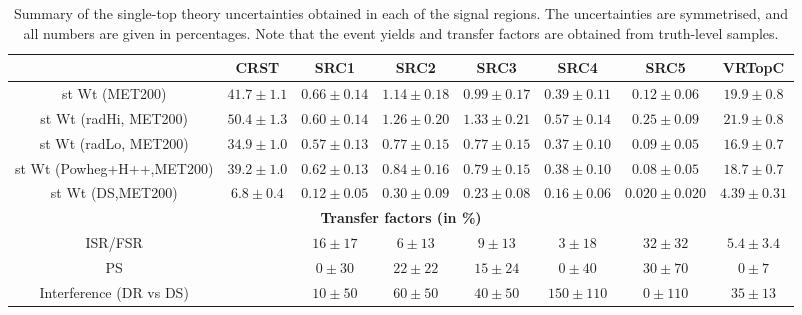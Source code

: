 \begin{description}
   \begin{table}[!h]
    \begin{center} \footnotesize
        \begin{tabular}{|c|c|c|c|c|c|c|c|}
        \hline
        & CRST  & SRC1 & SRC2 & SRC3 & SRC4 & SRC5 & VRTopC\\ \hline
          \hline
          st Wt (MET200)&          $41.7\pm 1.1$&          $0.66\pm 0.14$&         $1.14\pm 0.18$&         $0.99\pm 0.17$&         $0.39\pm 0.11$&         $0.12\pm 0.06$&         $19.9\pm 0.8$\\
          st Wt (radHi, MET200)&   $50.4\pm 1.3$&          $0.60\pm 0.14$&         $1.26\pm 0.20$&         $1.33\pm 0.21$&         $0.57\pm 0.14$&         $0.25\pm 0.09$&         $21.9\pm 0.8$\\
st Wt (radLo, MET200)&   $34.9\pm 1.0$&          $0.57\pm 0.13$&         $0.77\pm 0.15$&         $0.77\pm 0.15$&         $0.37\pm 0.10$&         $0.09\pm 0.05$&         $16.9\pm 0.7$\\
st Wt (Powheg+H++,MET200)&       $39.2\pm 1.0$&          $0.62\pm 0.13$&         $0.84\pm 0.16$&         $0.79\pm 0.15$&         $0.38\pm 0.10$&         $0.08\pm 0.05$&         $18.7\pm 0.7$\\
st Wt (DS,MET200)&       $6.8\pm 0.4$&   $0.12\pm 0.05$&         $0.30\pm 0.09$&         $0.23\pm 0.08$&         $0.16\pm 0.06$&         $0.020\pm 0.020$&       $4.39\pm 0.31$\\
          \hline \hline 
          \multicolumn{8}{c}{\bf Transfer factors (in \%)} \\ \hline
          ISR/FSR& &       $16\pm17$&      $6\pm13$&       $9\pm13$&       $3\pm18$&       $32\pm32$&      $5.4\pm3.4$\\
          PS &   &     $0\pm30$&       $22\pm22$&      $15\pm24$&      $0\pm40$&       $30\pm70$&      $0\pm7$\\
          Interference (DR vs DS) &  &      $10\pm50$&      $60\pm50$&      $40\pm50$&      $150\pm110$&    $0\pm110$&      $35\pm13$\\
          \hline
        \end{tabular}
    \end{center}
    \caption{Summary of the single-top theory uncertainties obtained in each of the signal regions. The uncertainties are symmetrised, and all numbers are given in percentages. Note that the event yields and transfer factors are obtained from truth-level samples. %
}
    \label{tab:single_top_unc3}
  \end{table}



\end{description}
